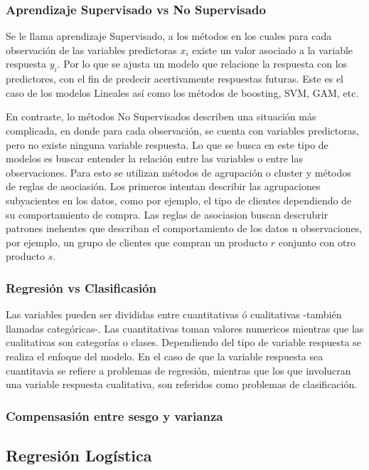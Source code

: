 \documentclass[a4paper,12pt]{Latex/Classes/PhDthesisPSnPDF}
\begin{document}
\subsubsection{Aprendizaje Supervisado vs No Supervisado}

Se le llama aprendizaje Supervisado, a los métodos en los cuales para cada observación de las variables predictoras $x_{i}$ existe un valor asociado a la variable respuesta $y_{i}$. Por lo que se ajusta un modelo que relacione la respuesta con los predictores, con el fin de predecir acertivamente respuestas futuras. Este es el caso de los modelos Lineales así como los métodos de boosting, SVM, GAM, etc. 

En contraste, lo métodos No Supervisados describen una situación más complicada, en donde para cada observación, se cuenta con variables predictoras, pero no existe ninguna variable respuesta. Lo que se busca en este tipo de modelos es buscar entender la relación entre las variables o entre las observaciones. Para esto se utilizan métodos de agrupación o cluster y métodos de reglas de asociasión. Los primeros intentan describir las agrupaciones subyacientes en los datos, como por ejemplo, el tipo de clientes dependiendo de su comportamiento de compra. Las reglas de asociasion buscan descrubrir patrones inehentes que describan el comportamiento de los datos u observaciones, por ejemplo, un grupo de clientes que compran un producto $r$ conjunto con otro producto $s$.

\subsubsection{Regresión vs Clasificasión}

Las variables pueden ser divididas entre cuantitativas ó cualitativas -también llamadas categóricas-. Las cuantitativas toman valores numericos mientras que las cualitativas son categorías o clases. Dependiendo del tipo de variable respuesta se realiza el enfoque del modelo. En el caso de que la variable respuesta sea cuantitavia se refiere a problemas de regresión, mientras que los que involucran una variable respuesta cualitativa, son referidos como problemas de clasificación.

\subsubsection{Compensasión entre sesgo y varianza}


\subsection{Regresión Logística}
\end{document}
